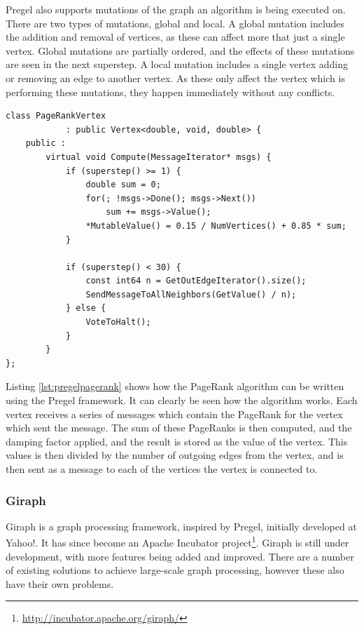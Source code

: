 Pregel also supports mutations of the graph an algorithm is being executed on. There are two types of mutations, global and local. A global mutation includes the addition and removal of vertices, as these can affect more that just a single vertex. Global mutations are partially ordered, and the effects of these mutations are seen in the next superstep. A local mutation includes a single vertex adding or removing an edge to another vertex. As these only affect the vertex which is performing these mutations, they happen immediately without any conflicts.

\begin{lstlisting}[float]
class PageRankVertex
			: public Vertex<double, void, double> {
	public :	
		virtual void Compute(MessageIterator* msgs) {
			if (superstep() >= 1) {
				double sum = 0;
				for(; !msgs->Done(); msgs->Next())
					sum += msgs->Value();
				*MutableValue() = 0.15 / NumVertices() + 0.85 * sum;
			}
			
			if (superstep() < 30) {
				const int64 n = GetOutEdgeIterator().size();
				SendMessageToAllNeighbors(GetValue() / n);
			} else {
				VoteToHalt();
			}
		}
};					
\end{lstlisting} 

Listing \ref{lst:pregelpagerank} shows how the PageRank algorithm \cite{pagerank} can be written using the Pregel framework. It can clearly be seen how the algorithm works. Each vertex receives a series of messages which contain the PageRank for the vertex which sent the message. The sum of these PageRanks is then computed, and the damping factor applied, and the result is stored as the value of the vertex. This values is then divided by the number of outgoing edges from the vertex, and is then sent as a message to each of the vertices the vertex is connected to.

\subsubsection{Giraph}
\label{sec:res_giraph}
Giraph is a graph processing framework, inspired by Pregel, initially developed at Yahoo!. It has since become an Apache Incubator project\footnote{\url{http://incubator.apache.org/giraph/}}. Giraph is still under development, with more features being added and improved. There are a number of existing solutions to achieve large-scale graph processing, however these also have their own problems.

